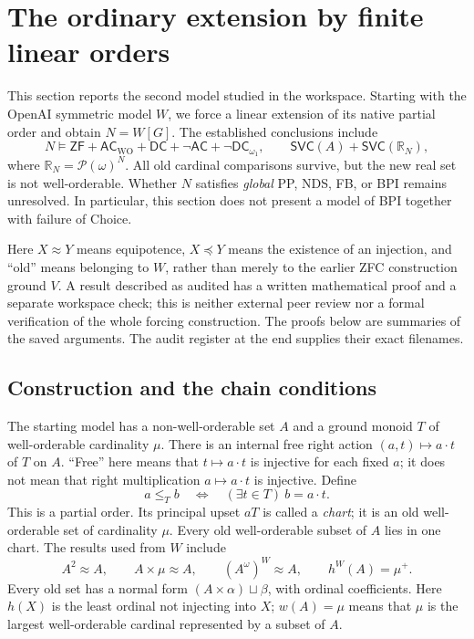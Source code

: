 \section{The ordinary extension by finite linear orders}
\label{sec:complete-new-model}

This section reports the second model studied in the workspace.  Starting
with the OpenAI symmetric model $W$, we force a linear extension of its
native partial order and obtain $N=W[G]$.  The established conclusions
include
\[
 N\models\mathsf{ZF}+\mathsf{AC}_{\mathrm{WO}}+\mathsf{DC}
       +\neg\mathsf{AC}+\neg\mathsf{DC}_{\omega_1},
 \qquad \mathsf{SVC}(A)+\mathsf{SVC}(\mathbb R_N),
\]
where $\mathbb R_N=\mathcal P(\omega)^N$.  All old cardinal comparisons
survive, but the new real set is not well-orderable.  Whether $N$ satisfies
\emph{global} PP, NDS, FB, or BPI remains unresolved.  In particular, this
section does not present a model of BPI together with failure of Choice.

Here $X\approx Y$ means equipotence, $X\preccurlyeq Y$ means the existence
of an injection, and ``old'' means belonging to $W$, rather than merely
to the earlier ZFC construction ground $V$.  A result described as
audited has a written mathematical proof and a separate workspace
check; this is neither external peer review nor a formal verification
of the whole forcing construction.  The proofs below are summaries of
the saved arguments.  The audit register at the end supplies their
exact filenames.

\subsection{Construction and the chain conditions}

The starting model has a non-well-orderable set $A$ and a ground monoid
$T$ of well-orderable cardinality $\mu$.  There is an internal free right
action $(a,t)\mapsto a\cdot t$ of $T$ on $A$.  ``Free'' here means that
$t\mapsto a\cdot t$ is injective for each fixed $a$; it does not mean
that right multiplication $a\mapsto a\cdot t$ is injective.  Define
\[
 a\leq_T b\quad\Longleftrightarrow\quad
       (\exists t\in T)\ b=a\cdot t.
\]
This is a partial order.  Its principal upset $aT$ is called a
\emph{chart}; it is an old well-orderable set of cardinality $\mu$.
Every old well-orderable subset of $A$ lies in one chart.  The results
used from $W$ include
\[
 A^2\approx A,\qquad A\times\mu\approx A,\qquad
 (A^\omega)^W\approx A,\qquad h^W(A)=\mu^+.
\]
Every old set has a normal form $(A\times\alpha)\sqcup\beta$, with
ordinal coefficients.  Here $h(X)$ is the least ordinal not injecting
into $X$; $w(A)=\mu$ means that $\mu$ is the largest well-orderable
cardinal represented by a subset of $A$.

